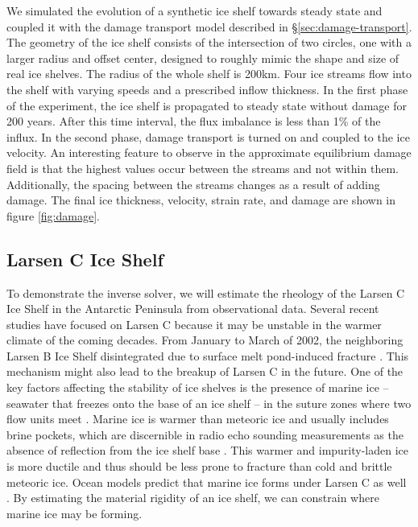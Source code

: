 \documentclass[journal abbreviation, manuscript]{copernicus}
\begin{document}
We simulated the evolution of a synthetic ice shelf towards steady state and coupled it with the damage transport model described in \S\ref{sec:damage-transport}.
The geometry of the ice shelf consists of the intersection of two circles, one with a larger radius and offset center, designed to roughly mimic the shape and size of real ice shelves.
The radius of the whole shelf is 200km.
Four ice streams flow into the shelf with varying speeds and a prescribed inflow thickness.
In the first phase of the experiment, the ice shelf is propagated to steady state without damage for 200 years.
After this time interval, the flux imbalance is less than 1\% of the influx.
In the second phase, damage transport is turned on and coupled to the ice velocity.
An interesting feature to observe in the approximate equilibrium damage field is that the highest values occur between the streams and not within them.
Additionally, the spacing between the streams changes as a result of adding damage.
The final ice thickness, velocity, strain rate, and damage are shown in figure \ref{fig:damage}.


\subsection{Larsen C Ice Shelf}

To demonstrate the inverse solver, we will estimate the rheology of the Larsen C Ice Shelf in the Antarctic Peninsula from observational data.
Several recent studies have focused on Larsen C because it may be unstable in the warmer climate of the coming decades.
From January to March of 2002, the neighboring Larsen B Ice Shelf disintegrated due to surface melt pond-induced fracture \citep{banwell2013breakup}.
This mechanism might also lead to the breakup of Larsen C in the future.
One of the key factors affecting the stability of ice shelves is the presence of marine ice -- seawater that freezes onto the base of an ice shelf -- in the suture zones where two flow units meet \citep{kulessa2014marine}.
Marine ice is warmer than meteoric ice and usually includes brine pockets, which are discernible in radio echo sounding measurements as the absence of reflection from the ice shelf base \citep{holland2009marine}.
This warmer and impurity-laden ice is more ductile and thus should be less prone to fracture than cold and brittle meteoric ice.
Ocean models predict that marine ice forms under Larsen C as well \citep{holland2009marine}.
By estimating the material rigidity of an ice shelf, we can constrain where marine ice may be forming.
\end{document}
